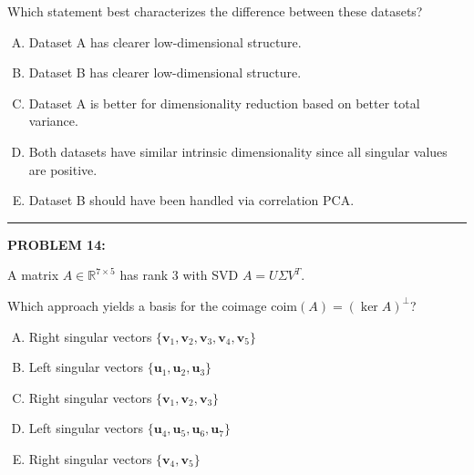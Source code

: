 \documentclass[12pt]{amsart}
\newcommand{\divider}{
  \vspace{-1em} %
  \noindent
  \raisebox{-0.15ex}{\textbullet}%
  \hspace{0.5em}%
  \rule[0.5ex]{0.95\textwidth}{1.0pt}%
  \hspace{0.5em}%
  \raisebox{-0.15ex}{\textbullet}%
  \vspace{0em} %
}
\begin{document}
Which statement best characterizes the difference between these datasets?

\begin{enumerate}[(A)]
\item Dataset A has clearer low-dimensional structure.
\item Dataset B has clearer low-dimensional structure.
\item Dataset A is better for dimensionality reduction based on better total variance.
\item Both datasets have similar intrinsic dimensionality since all singular values are positive.
\item Dataset B should have been handled via correlation PCA.
\end{enumerate}


\divider


{\bf PROBLEM 14:}

A matrix $A \in \mathbb{R}^{7 \times 5}$ has rank 3 with SVD $A = U\Sigma V^T$.

Which approach yields a basis for the coimage $\text{coim}(A) = (\ker A)^\perp$?

\begin{enumerate}[(A)]
\item Right singular vectors $\{\mathbf{v}_1, \mathbf{v}_2, \mathbf{v}_3, \mathbf{v}_4, \mathbf{v}_5\}$
\item Left singular vectors $\{\mathbf{u}_1, \mathbf{u}_2, \mathbf{u}_3\}$
\item Right singular vectors $\{\mathbf{v}_1, \mathbf{v}_2, \mathbf{v}_3\}$
\item Left singular vectors $\{\mathbf{u}_4, \mathbf{u}_5, \mathbf{u}_6, \mathbf{u}_7\}$
\item Right singular vectors $\{\mathbf{v}_4, \mathbf{v}_5\}$
\end{enumerate}
\end{document}
